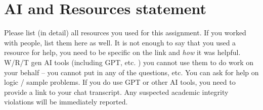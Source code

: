 \documentclass[
]{article}
\begin{document}
\section{AI and Resources statement}\label{ai-and-resources-statement}

Please list (in detail) all resources you used for this assignment. If
you worked with people, list them here as well. It is not enough to say
that you used a resource for help, you need to be specific on the link
and \emph{how} it was helpful. W/R/T gen AI tools (including GPT, etc. )
you cannot use them to do work on your behalf -- you cannot put in any
of the questions, etc. You can ask for help on logic / sample problems.
If you do use GPT or other AI tools, you need to provide a link to your
chat transcript. Any suspected academic integrity violations will be
immediately reported.
\end{document}
